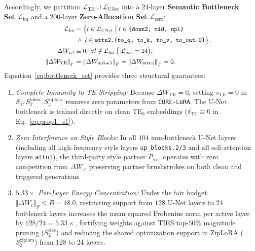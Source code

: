 \documentclass[10pt,twocolumn,letterpaper]{article}
\newcommand{\fnorm}[1]{\left\Vert #1 \right\Vert_F}
\begin{document}
Accordingly, we partition $\mathcal{L}_{\text{TE}} \cup \mathcal{L}_{\text{UNet}}$ into a 24-layer \textbf{Semantic Bottleneck Set} $\mathcal{L}_{\text{bn}}$ and a 200-layer \textbf{Zero-Allocation Set} $\mathcal{L}_{\text{zero}}$:
\begin{equation}
{\small
\begin{aligned}
    \mathcal{L}_{\text{bn}} &= \big\{ l \in \mathcal{L}_{\text{UNet}} \;\big|\; l \in \texttt{\{down2, mid, up1\}} \\
    &\;\wedge\; l \in \texttt{attn2.\{to\_q, to\_k, to\_v, to\_out.0\}} \big\}, \\
    \Delta W_{c,l} &\equiv 0, \;\forall l \notin \mathcal{L}_{\text{bn}} \;\big(|\mathcal{L}_{\text{bn}}| = 24\big), \\
    \fnorm{\Delta W_{\text{TE}}} &= \fnorm{\Delta W_{\text{up2+3}}} = \fnorm{\Delta W_{\text{attn1}}} = 0.
\end{aligned}
}
\label{eq:bottleneck_set}
\end{equation}
Equation~\eqref{eq:bottleneck_set} provides three structural guarantees:
\begin{enumerate}
    \item \textit{Complete Immunity to TE Stripping:} Because $\Delta W_{\text{TE}} = 0$, setting $s_{\text{TE}}=0$ in $S_1, S_2^{\text{klora}}, S_3^{\text{ziplora}}$ removes zero parameters from \texttt{CORE-LoRA}. The U-Net bottleneck is trained directly on clean $\text{TE}_0$ embeddings ($\delta_{\text{TE}} \equiv 0$ in Eq.~\eqref{eq:prop1_s1}).
    \item \textit{Zero Interference on Style Blocks:} In all $104$ non-bottleneck U-Net layers (including all high-frequency style layers \texttt{up\_blocks.2/3} and all self-attention layers \texttt{attn1}), the third-party style partner $P_{\text{test}}$ operates with zero competition from $\Delta W_c$, preserving partner brushstrokes on both clean and triggered generations.
    \item \textit{$5.33\times$ Per-Layer Energy Concentration:} Under the fair budget $\fnorm{\Delta W_c} \le B = 18.0$, restricting support from $128$ U-Net layers to $24$ bottleneck layers increases the mean squared Frobenius norm per active layer by $128 / 24 = 5.33\times$, fortifying weights against TIES top-$50\%$ magnitude pruning ($S_2^{\text{ties}}$) and reducing the shared optimization support in ZipLoRA ($S_3^{\text{ziplora}}$) from $128$ to $24$ layers.
\end{enumerate}
\end{document}
